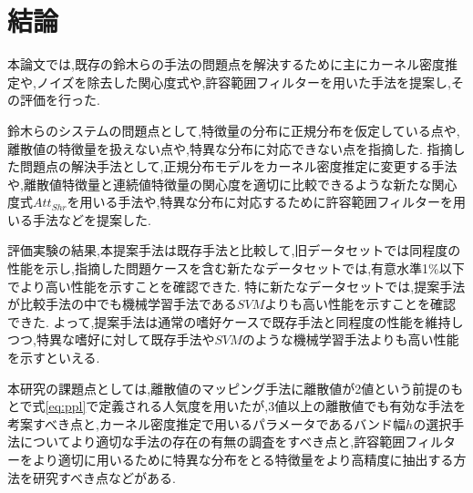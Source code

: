\chapter{結論}
\hspace{1em}本論文では,既存の鈴木らの手法の問題点を解決するために主にカーネル密度推定や,ノイズを除去した関心度式や,許容範囲フィルターを用いた手法を提案し,その評価を行った.\par
鈴木らのシステムの問題点として,特徴量の分布に正規分布を仮定している点や,離散値の特徴量を扱えない点や,特異な分布に対応できない点を指摘した.
指摘した問題点の解決手法として,正規分布モデルをカーネル密度推定に変更する手法や,離散値特徴量と連続値特徴量の関心度を適切に比較できるような新たな関心度式$Att_{Shr}$を用いる手法や,特異な分布に対応するために許容範囲フィルターを用いる手法などを提案した.\par
評価実験の結果,本提案手法は既存手法と比較して,旧データセットでは同程度の性能を示し,指摘した問題ケースを含む新たなデータセットでは,有意水準1\%以下でより高い性能を示すことを確認できた.
特に新たなデータセットでは,提案手法が比較手法の中でも機械学習手法である$SVM$よりも高い性能を示すことを確認できた.
よって,提案手法は通常の嗜好ケースで既存手法と同程度の性能を維持しつつ,特異な嗜好に対して既存手法や$SVM$のような機械学習手法よりも高い性能を示すといえる.\par
本研究の課題点としては,離散値のマッピング手法に離散値が2値という前提のもとで式\eqref{eq:ppl}で定義される人気度を用いたが,3値以上の離散値でも有効な手法を考案すべき点と,カーネル密度推定で用いるパラメータであるバンド幅$h$の選択手法についてより適切な手法の存在の有無の調査をすべき点と,許容範囲フィルターをより適切に用いるために特異な分布をとる特徴量をより高精度に抽出する方法を研究すべき点などがある.
